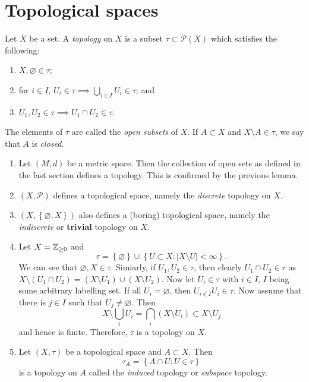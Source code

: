 
\section{Topological spaces}

\begin{definition}[Topology]
	Let $X$ be a set.
	A \emph{topology} on $X$ is a subset $\tau \subset \mathcal P(X)$ which 
	satisfies the following:
	\begin{enumerate}
		\item $X, \varnothing \in \tau$;
		\item for $i \in I$, 
			$U_i \in \tau \implies \bigcup_{i \in I} U_i \in \tau$; and
		\item $U_1, U_2 \in \tau \implies U_1 \cap U_2 \in \tau$.
	\end{enumerate}
	The elements of $\tau$ are called the \emph{open subsets} of $X$.
	If $A \subset X$ and $X \setminus A \in \tau$, we say that $A$ is 
	\emph{closed}.
\end{definition}

\begin{examples}
	\hfill
	\begin{enumerate}
		\item 
		Let $(M,d)$ be a metric space.
		Then the collection of open sets as defined in the last section defines 
		a topology.
		This is confirmed by the previous lemma.

		\item
		$(X, \mathcal P)$ defines a topological space, namely the 
		\emph{discrete} topology on $X$.

		\item
		$(X, \left\{ \varnothing, X \right\})$ 
		also defines a (boring) topological
		space, namely the \emph{indiscrete} or \textbf{trivial} topology 
		on $X$.

		\item
		Let $X = \mathbb{Z}_{\geq 0}$ and
		\[
			\tau = \left\{ \varnothing \right\} \cup
			\left\{ 
				U \subset X: \left\lvert X \setminus U \right\rvert < \infty 
			\right\}.
		\]
		We can see that $\varnothing, X \in \tau$.
		Simiarly, if $U_1, U_2 \in \tau$, then clearly $U_1 \cap U_2 \in \tau$
		as 
		$X \setminus (U_1 \cap U_2) = (X \setminus U_1) \cup (X \setminus U_2)$.
		Now let $U_i \in \tau$ with $i \in I$, $I$ being some arbitrary 
		labelling set.
		If all $U_i = \varnothing$, then $U_{i \in I} U_i \in \tau$.
		Now assume that there is $j \in I$ such that $U_j \neq \varnothing$.
		Then
		\[
			X \setminus \bigcup_i U_i 
			= \bigcap_i (X \setminus U_i) 
			\subset X \setminus U_j
		\]
		and hence is finite.
		Therefore, $\tau$ is a topology on $X$.

		\item 
		Let $(X, \tau)$ be a topological space and $A \subset X$.
		Then 
		\[ 
			\tau_A = \left\{ A \cap U: U \in \tau \right\}
		\]
		is a topology  on $A$ called the \emph{induced} topology or 
		\emph{subspace} topology.
	\end{enumerate}
\end{examples}

